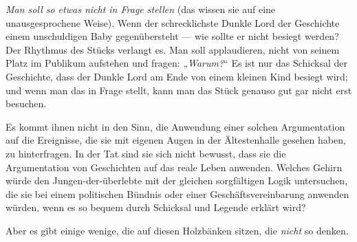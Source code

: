 \emph{Man soll so etwas nicht in Frage stellen} (das wissen sie auf eine unausgesprochene Weise). Wenn der schrecklichste Dunkle Lord der Geschichte einem unschuldigen Baby gegenübersteht — wie sollte er nicht besiegt werden? Der Rhythmus des Stücks verlangt es. Man soll applaudieren, nicht von seinem Platz im Publikum aufstehen und fragen:
„\emph{Warum?}“ Es ist nur das Schicksal der Geschichte, dass der Dunkle Lord am Ende von einem kleinen Kind besiegt wird; und wenn man das in Frage stellt, kann man das Stück genauso gut gar nicht erst besuchen.

Es kommt ihnen nicht in den Sinn, die Anwendung einer solchen Argumentation auf die Ereignisse, die sie mit eigenen Augen in der Ältestenhalle gesehen haben, zu hinterfragen. In der Tat sind sie sich nicht bewusst, dass sie die Argumentation von Geschichten auf das reale Leben anwenden. Welches Gehirn würde den Jungen-der-überlebte mit der gleichen sorgfältigen Logik untersuchen, die sie bei einem politischen Bündnis oder einer Geschäftsvereinbarung anwenden würden, wenn es so bequem durch Schicksal und Legende erklärt wird?

Aber es gibt einige wenige, die auf diesen Holzbänken sitzen, die \emph{nicht} so denken.

